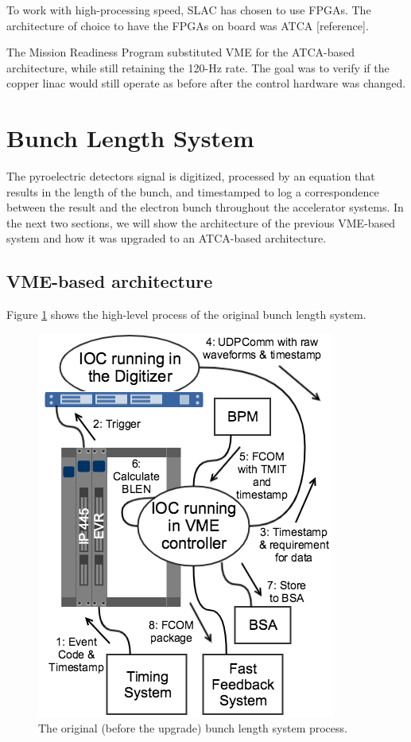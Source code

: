 \documentclass[letter,
        biblatex,   %
        keeplastbox,  %
        ]{jacow}
\begin{document}
To work with high-processing speed, SLAC has chosen to use FPGAs. The architecture of choice to have the FPGAs on board was ATCA [reference].

The Mission Readiness Program substituted VME for the ATCA-based architecture, while still retaining the 120-Hz rate. The goal was to verify if the copper linac would still operate as before after the control hardware was changed.

\section{Bunch Length System}
The pyroelectric detectors signal is digitized, processed by an equation that results in the length of the bunch, and timestamped to log a correspondence between the result and the electron bunch throughout the accelerator systems. In the next two sections, we will show the architecture of the previous VME-based system and how it was upgraded to an ATCA-based architecture.

\subsection{VME-based architecture}
Figure \ref{fig:blen_vme} shows the high-level process of the original bunch length system.

\begin{figure}[!htb]
  \centering
  \includegraphics*[width=.8\columnwidth]{BLEN_VME_Process}
  \caption{The original (before the upgrade) bunch length system process.}
  \label{fig:blen_vme}
\end{figure}
\end{document}
